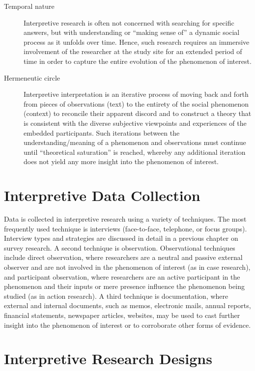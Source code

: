 \begin{description}
	\item[Temporal nature] Interpretive research is often not concerned with searching for specific answers, but with understanding or ``making sense of'' a dynamic social process as it unfolds over time. Hence, such research requires an immersive involvement of the researcher at the study site for an extended period of time in order to capture the entire evolution of the phenomenon of interest.

	\item[Hermeneutic circle] Interpretive interpretation is an iterative process of moving back and forth from pieces of observations (text) to the entirety of the social phenomenon (context) to reconcile their apparent discord and to construct a theory that is consistent with the diverse subjective viewpoints and experiences of the embedded participants. Such iterations between the understanding/meaning of a phenomenon and observations must continue until ``theoretical saturation'' is reached, whereby any additional iteration does not yield any more insight into the phenomenon of interest.

\end{description}

\section{Interpretive Data Collection}

Data is collected in interpretive research using a variety of techniques. The most frequently used technique is interviews (face-to-face, telephone, or focus groups). Interview types and strategies are discussed in detail in a previous chapter on survey research. A second technique is observation. Observational techniques include direct observation, where researchers are a neutral and passive external observer and are not involved in the phenomenon of interest (as in case research), and participant observation, where researchers are an active participant in the phenomenon and their inputs or mere presence influence the phenomenon being studied (as in action research). A third technique is documentation, where external and internal documents, such as memos, electronic mails, annual reports, financial statements, newspaper articles, websites, may be used to cast further insight into the phenomenon of interest or to corroborate other forms of evidence.

\section{Interpretive Research Designs}

